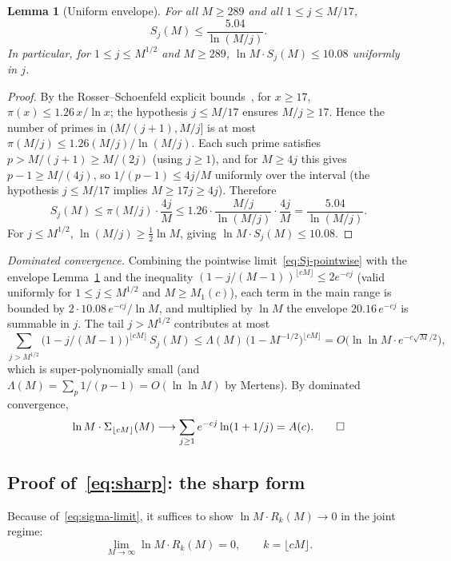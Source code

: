 \documentclass[11pt]{article}
\newtheorem{lemma}[theorem]{Lemma}
\theoremstyle{remark}
\begin{document}
\begin{lemma}[Uniform envelope]\label{lem:envelope}
For all $M \geq 289$ and all $1 \leq j \leq M/17$,
\[
S_j(M) \leq \frac{5.04}{\ln(M/j)}.
\]
In particular, for $1 \leq j \leq M^{1/2}$ and $M \geq 289$, $\ln M \cdot S_j(M) \leq 10.08$ uniformly in $j$.
\end{lemma}
\begin{proof}
By the Rosser--Schoenfeld explicit bounds~\cite{RosserSchoenfeld1962}, for $x \geq 17$, $\pi(x) \leq 1.26\, x/\ln x$; the hypothesis $j \leq M/17$ ensures $M/j \geq 17$. Hence the number of primes in $(M/(j+1), M/j]$ is at most $\pi(M/j) \leq 1.26(M/j)/\ln(M/j)$. Each such prime satisfies $p > M/(j+1) \geq M/(2j)$ (using $j \geq 1$), and for $M \geq 4j$ this gives $p - 1 \geq M/(4j)$, so $1/(p-1) \leq 4j/M$ uniformly over the interval (the hypothesis $j \leq M/17$ implies $M \geq 17j \geq 4j$). Therefore
\[
S_j(M) \leq \pi(M/j) \cdot \frac{4j}{M} \leq 1.26 \cdot \frac{M/j}{\ln(M/j)} \cdot \frac{4j}{M} = \frac{5.04}{\ln(M/j)}.
\]
For $j \leq M^{1/2}$, $\ln(M/j) \geq \tfrac12 \ln M$, giving $\ln M \cdot S_j(M) \leq 10.08$.
\end{proof}

\emph{Dominated convergence.} Combining the pointwise limit~\eqref{eq:Sj-pointwise} with the envelope Lemma~\ref{lem:envelope} and the inequality $(1 - j/(M-1))^{\lfloor cM \rfloor} \leq 2 e^{-cj}$ (valid uniformly for $1 \leq j \leq M^{1/2}$ and $M \geq M_1(c)$), each term in the main range is bounded by $2 \cdot 10.08\, e^{-cj}/\ln M$, and multiplied by $\ln M$ the envelope $20.16\, e^{-cj}$ is summable in $j$. The tail $j > M^{1/2}$ contributes at most
\[
\sum_{j > M^{1/2}}\bigl(1 - j/(M-1)\bigr)^{\lfloor cM \rfloor}\, S_j(M) \leq \Lambda(M)\,\bigl(1 - M^{-1/2}\bigr)^{\lfloor cM \rfloor} = O\bigl(\ln\ln M\cdot e^{-c\sqrt{M}/2}\bigr),
\]
which is super-polynomially small (and $\Lambda(M) = \sum_p 1/(p-1) = O(\ln\ln M)$ by Mertens). By dominated convergence,
\[
\ln M \cdot \Sigma_{\lfloor cM \rfloor}(M) \longrightarrow \sum_{j \geq 1} e^{-cj}\ln(1 + 1/j) = A(c). \qed
\]

\subsection[Sharp joint-scaling form]{Proof of~\eqref{eq:sharp}: the sharp form}\label{sec:thm4-sharp}

Because of~\eqref{eq:sigma-limit}, it suffices to show $\ln M \cdot R_k(M) \to 0$ in the joint regime:
\begin{equation}\label{eq:Rk-sharp}
\lim_{M \to \infty} \ln M \cdot R_k(M) = 0, \qquad k = \lfloor cM \rfloor.
\end{equation}
\end{document}

